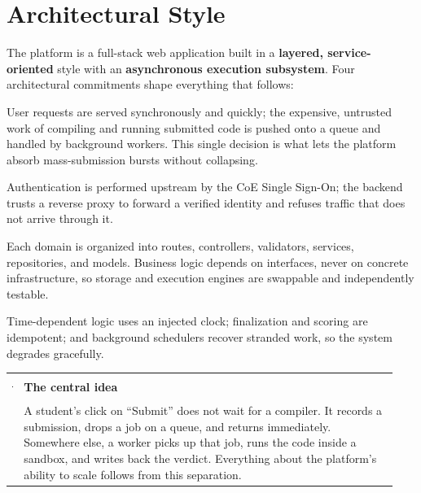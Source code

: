 \documentclass[12pt,a4paper,oneside]{report}
\makeatletter
\newenvironment{callout}[1]{\par\vspace{4pt}\noindent
  \begin{tabular}{@{}p{0.014\linewidth}@{\hspace{0.6em}}p{0.93\linewidth}@{}}
  \textcolor{boxframe}{\rule{2pt}{\baselineskip}} & \textbf{\textcolor{tcetblue}{#1}}\\[2pt] & }{\end{tabular}\par\vspace{6pt}}
\makeatother
\begin{document}
\section{Architectural Style}
The platform is a full-stack web application built in a \textbf{layered,
service-oriented} style with an \textbf{asynchronous execution subsystem}. Four
architectural commitments shape everything that follows:

\begin{description}[leftmargin=1.6em,style=nextline]
  \item[Separation of request handling from code execution] User requests are
        served synchronously and quickly; the expensive, untrusted work of
        compiling and running submitted code is pushed onto a queue and handled
        by background workers. This single decision is what lets the platform
        absorb mass-submission bursts without collapsing.
  \item[A hard trust boundary at the edge] Authentication is performed upstream
        by the CoE Single Sign-On; the backend trusts a reverse proxy to forward
        a verified identity and refuses traffic that does not arrive through it.
  \item[Layering with dependency inversion] Each domain is organized into
        routes, controllers, validators, services, repositories, and models.
        Business logic depends on interfaces, never on concrete infrastructure,
        so storage and execution engines are swappable and independently
        testable.
  \item[Deterministic, self-healing behaviour] Time-dependent logic uses an
        injected clock; finalization and scoring are idempotent; and background
        schedulers recover stranded work, so the system degrades gracefully.
\end{description}

\begin{callout}{The central idea}
A student's click on ``Submit'' does not wait for a compiler. It records a
submission, drops a job on a queue, and returns immediately. Somewhere else, a
worker picks up that job, runs the code inside a sandbox, and writes back the
verdict. Everything about the platform's ability to scale follows from this
separation.
\end{callout}
\end{document}
